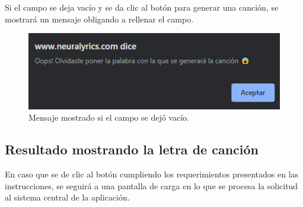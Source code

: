 \documentclass[12pt, a4paper, titlepage]{article}
\begin{document}
	Si el campo se deja vacío y se da clic al botón para generar una canción, se mostrará un mensaje obligando a rellenar el campo.
	
	\begin{figure}[H] 
		\includegraphics[width=13.5cm]{./Imagenes/Capturas/Noword.png}
		\centering \caption{Mensaje mostrado si el campo se dejó vacío.}
	\end{figure}
	\subsection{Resultado mostrando la letra de canción}
	En caso que se de clic al botón cumpliendo los requerimientos presentados en las instrucciones, se seguirá a una pantalla de carga en lo que se procesa la solicitud al sistema central de la aplicación.
	
\end{document}

